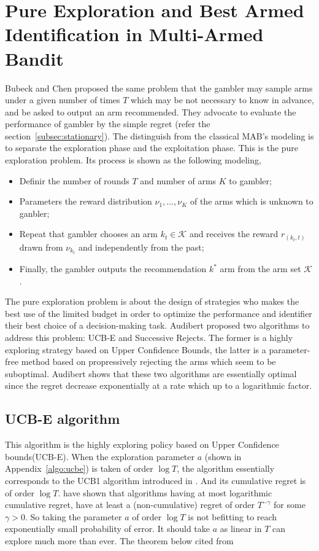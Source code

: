 \section{Pure Exploration and Best Armed Identification in Multi-Armed Bandit}
\label{sec:bestarm}

Bubeck \cite{bubeck2009pure, bubeck2011pure} and Chen \cite{chen2014combinatorial} proposed the same problem that the gambler may sample arms under a given number of times $T$ which may be not necessary to know in advance, and be asked to output an arm recommended. They advocate to evaluate the performance of gambler by the simple regret (refer the section~\ref{subsec:stationary}). The distinguish from the classical MAB's modeling is to separate the exploration phase and the exploitation phase. This is the pure exploration problem. Its process is shown as the following modeling,
\begin{itemize}
\item	Definir the number of rounds $T$ and number of arms $K$ to gambler;
\item	Parameters the reward distribution $\nu_1,\dots,\nu_K$ of the arms which is unknown to ganbler;
\item	Repeat that gambler chooses an arm $k_t \in \mathscr{K}$ and receives the reward $r_{(k_t,t)}$ drawn from $\nu_{k_t}$ and independently from the past;
\item Finally, the gambler outputs the recommendation $k^{\ast}$ arm from the arm set $\mathscr{K}$.
\end{itemize}

The pure exploration problem is about the design of strategies who makes the best use of the limited budget in order to optimize the performance and identifier their best choice of a decision-making task. Audibert \cite{audibert2010best} proposed two algorithms to address this problem: UCB-E and Successive Rejects. The former is a highly exploring strategy based on Upper Confidence Bounds, the latter is a parameter-free method based on propressively rejecting the arms which seem to be suboptimal. Audibert shows that these two algorithms are essentially optimal since the regret decrease exponentially at a rate which up to a logarithmic factor.

\subsection*{UCB-E algorithm} 
This algorithm is the highly exploring policy based on Upper Confidence bounds(UCB-E). When the exploration parameter $a$ (shown in Appendix~\ref{algo:ucbe}) is taken of order $\log{T}$, the algorithm essentially corresponds to the UCB1 algorithm introduced in \cite{auer2010ucb}. And its cumulative regret is of order $\log{T}$. \cite{bubeck2009pure} have shown that algorithms having at most logarithmic cumulative regret, have at least a (non-cumulative) regret of order $T^{-\gamma}$ for some $\gamma > 0$. So taking the parameter $a$ of order $\log{T}$ is not befitting to reach exponentially small probability of error. It should take $a$ as linear in $T$ can explore much more than ever. The theorem below cited from \cite{audibert2010best}

